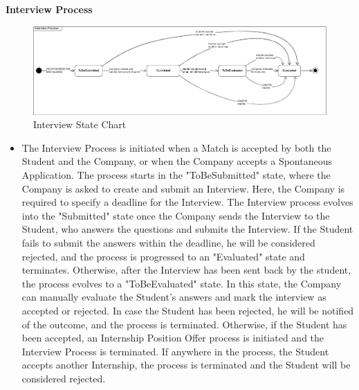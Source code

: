 \noindent\textbf{Interview Process}\\
\begin{figure}[H]
    \centering
    \includegraphics[width=1 \textwidth]{Diagrams/StateCharts/InterviewProcessStateChart.png}
    \caption{Interview State Chart}
    \label{fig:InterviewProcess}
\end{figure}
\begin{itemize}
    \item The Interview Process is initiated when a Match is accepted by both the Student and the Company, or when the Company accepts a Spontaneous Application. The process starts in the "ToBeSubmitted" state, where the Company is asked to create and submit an Interview. Here, the Company is required to specify a deadline for the Interview. The Interview process evolves into the "Submitted" state once the Company sends the Interview to the Student, who answers the questions and submits the Interview. If the Student fails to submit the answers within the deadline, he will be considered rejected, and the process is progressed to an "Evaluated" state and terminates. Otherwise, after the Interview has been sent back by the student, the process evolves to a "ToBeEvaluated" state. In this state, the Company can manually evaluate the Student's answers and mark the interview as accepted or rejected. In case the Student has been rejected, he will be notified of the outcome, and the process is terminated. Otherwise, if the Student has been accepted, an Internship Position Offer process is initiated and the Interview Process is terminated. If anywhere in the process, the Student accepts another Internship, the process is terminated and the Student will be considered rejected.
\end{itemize}

